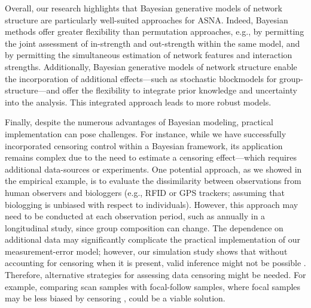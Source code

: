 \documentclass[Afour,sageh,times]{sagej}
\begin{document}
Overall, our research highlights that Bayesian generative models of network structure are particularly well-suited approaches for ASNA. Indeed, Bayesian methods offer greater flexibility than permutation approaches, e.g., by permitting the joint assessment of in-strength and out-strength within the same model, and by permitting the simultaneous estimation of network features and interaction strengths. Additionally, Bayesian generative models of network structure enable the incorporation of additional effects---such as stochastic blockmodels for group-structure---and offer the flexibility to integrate prior knowledge and uncertainty into the analysis. This integrated approach leads to more robust models. %

Finally, despite the numerous advantages of Bayesian modeling, practical implementation can pose challenges. For instance, while we have successfully incorporated censoring control within a Bayesian framework, its application remains complex due to the need to estimate a censoring effect---which requires additional data-sources or experiments. One potential approach, as we showed in the empirical example, is to evaluate the dissimilarity between observations from human observers and biologgers (e.g., RFID or GPS trackers; assuming that biologging is unbiased with respect to individuals). However, this approach may need to be conducted at each observation period, such as annually in a longitudinal study, since group composition can change. The dependence on additional data may significantly complicate the practical implementation of our measurement-error model; however, our simulation study shows that without accounting for censoring when it is present, valid inference might not be possible . Therefore, alternative strategies for assessing data censoring might be needed. For example, comparing scan samples with focal-follow samples, where focal samples may be less biased by censoring \citep{gilby2010direct}, could be a viable solution. 
\end{document}
